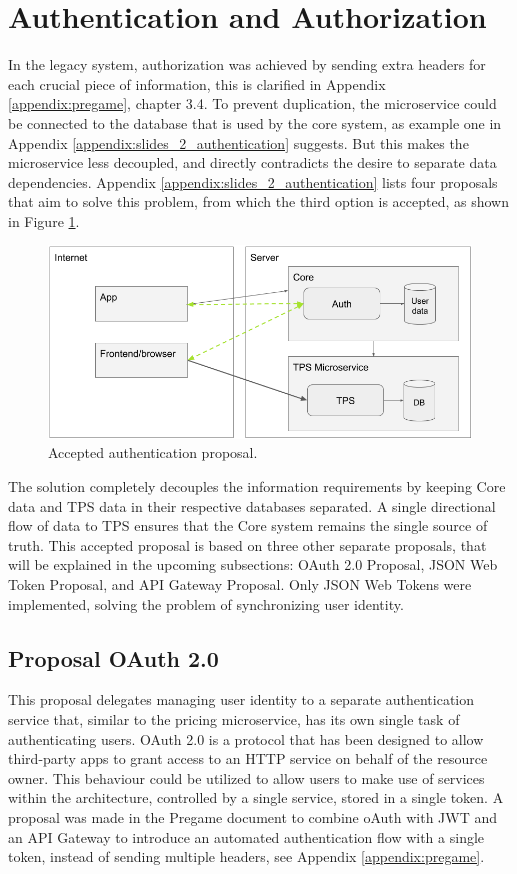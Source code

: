 \section{Authentication and Authorization}
In the legacy system, authorization was achieved by sending extra headers for each crucial piece of information, this is clarified in Appendix \ref{appendix:pregame}, chapter 3.4. To prevent duplication, the microservice could be connected to the database that is used by the core system, as example one in Appendix \ref{appendix:slides_2_authentication} suggests. But this makes the microservice less decoupled, and directly contradicts the desire to separate data dependencies. Appendix \ref{appendix:slides_2_authentication} lists four proposals that aim to solve this problem, from which the third option is accepted, as shown in Figure \ref{fig:Authentication}.

\begin{figure}[H]
	\centering
	\includegraphics[width=1\textwidth]{Authentication}
	\caption[Authentication]{Accepted authentication proposal.}
	\label{fig:Authentication}
\end{figure}

The solution completely decouples the information requirements by keeping Core data and TPS data in their respective databases separated. A single directional flow of data to TPS ensures that the Core system remains the single source of truth. This accepted proposal is based on three other separate proposals, that will be explained in the upcoming subsections: OAuth 2.0 Proposal, JSON Web Token Proposal, and API Gateway Proposal. Only JSON Web Tokens were implemented, solving the problem of synchronizing user identity.

\subsection{Proposal OAuth 2.0}
This proposal delegates managing user identity to a separate authentication service that, similar to the pricing microservice, has its own single task of authenticating users. OAuth 2.0 is a protocol that has been designed to allow third-party apps to grant access to an HTTP service on behalf of the resource owner. This behaviour could be utilized to allow users to make use of services within the architecture, controlled by a single service, stored in a single token. A proposal was made in the Pregame document to combine oAuth with JWT and an API Gateway to introduce an automated authentication flow with a single token, instead of sending multiple headers, see Appendix \ref{appendix:pregame}.

